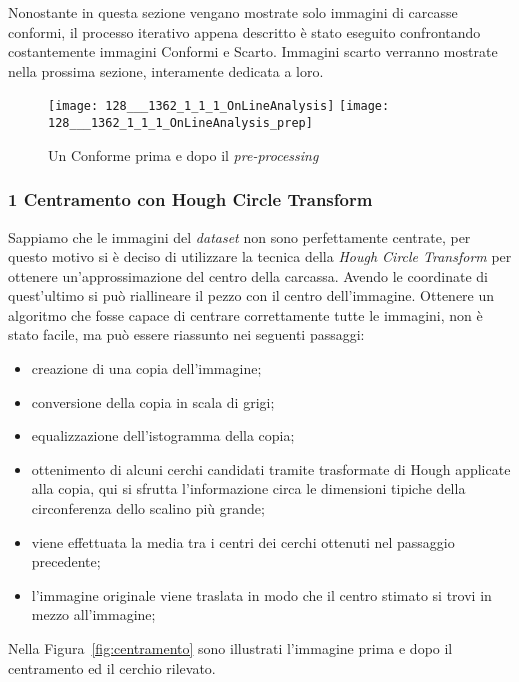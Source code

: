 Nonostante in questa sezione vengano mostrate solo immagini di carcasse conformi, il processo iterativo appena descritto è stato eseguito confrontando costantemente immagini Conformi e Scarto.
Immagini scarto verranno mostrate nella prossima sezione, interamente dedicata a loro.

\begin{figure}[ht] %
  \begin{center}
    \texttt{[image: 128\_\_\_1362\_1\_1\_1\_OnLineAnalysis]}
    \texttt{[image: 128\_\_\_1362\_1\_1\_1\_OnLineAnalysis\_prep]}
    \caption{Un Conforme prima e dopo il \textit{pre-processing}}
    \label{fig:prima_dopo_prep}
  \end{center}
\end{figure}

\subsubsection{1 Centramento con Hough Circle Transform}
Sappiamo che le immagini del \textit{dataset} non sono perfettamente centrate, per questo motivo si è deciso di utilizzare la tecnica della \textit{Hough Circle Transform} per ottenere un'approssimazione del centro della carcassa.
Avendo le coordinate di quest'ultimo si può riallineare il pezzo con il centro dell'immagine.
Ottenere un algoritmo che fosse capace di centrare correttamente tutte le immagini, non è stato facile, ma può essere riassunto nei seguenti passaggi:
\begin{itemize}
  \item creazione di una copia dell'immagine;
  \item conversione della copia in scala di grigi;
  \item equalizzazione dell'istogramma della copia;
  \item ottenimento di alcuni cerchi candidati tramite trasformate di Hough applicate alla copia, qui si sfrutta l'informazione circa le dimensioni tipiche della circonferenza dello scalino più grande;
  \item viene effettuata la media tra i centri dei cerchi ottenuti nel passaggio precedente;
  \item l'immagine originale viene traslata in modo che il centro stimato si trovi in mezzo all'immagine;
\end{itemize}

Nella Figura~\ref{fig:centramento} sono illustrati l'immagine prima e dopo il centramento ed il cerchio rilevato.

